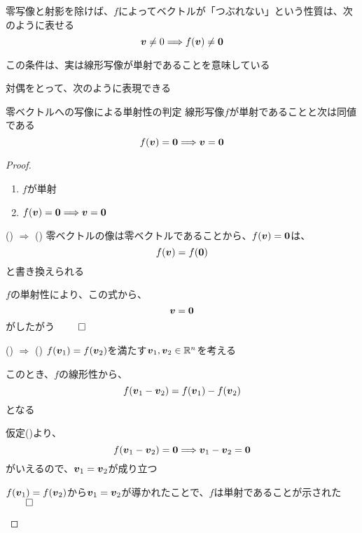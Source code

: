 \documentclass[../../../topic_linear-algebra]{subfiles}
\begin{document}
\sectionline

零写像と射影を除けば、$f$によってベクトルが「つぶれない」という性質は、次のように表せる
\begin{equation*}
  \vb*{v} \neq 0 \Longrightarrow f(\vb*{v}) \neq \vb*{0}
\end{equation*}


この条件は、実は線形写像が単射であることを意味している

対偶をとって、次のように表現できる

\begin{theorem}{零ベクトルへの写像による単射性の判定}\label{thm:injective-zero-test}
  線形写像$f$が単射であることと次は同値である
  \begin{equation*}
    f(\vb*{v}) = \vb*{0} \Longrightarrow \vb*{v} = \vb*{0}
  \end{equation*}
\end{theorem}

\begin{proof}
  \begin{enumerate}[label=\romanlabel]
    \item $f$が単射
    \item $f(\vb*{v}) = \vb*{0} \Longrightarrow \vb*{v} = \vb*{0}$
  \end{enumerate}

  \begin{subpattern}{() $\Longrightarrow$ ()}
    零ベクトルの像は零ベクトルであることから、$f(\vb*{v}) = \vb*{0}$は、
    \begin{equation*}
      f(\vb*{v}) = f(\vb*{0})
    \end{equation*}
    と書き換えられる

    $f$の単射性により、この式から、
    \begin{equation*}
      \vb*{v} = \vb*{0}
    \end{equation*}
    がしたがう $\qed$
  \end{subpattern}

  \begin{subpattern}{() $\Longrightarrow$ ()}
    $f(\vb*{v}_1) = f(\vb*{v}_2)$を満たす$\vb*{v}_1, \vb*{v}_2 \in \mathbb{R}^n$を考える

    このとき、$f$の線形性から、
    \begin{equation*}
      f(\vb*{v}_1 - \vb*{v}_2) = f(\vb*{v}_1) - f(\vb*{v}_2)
    \end{equation*}
    となる

    仮定()より、
    \begin{equation*}
      f(\vb*{v}_1 - \vb*{v}_2) = \vb*{0} \Longrightarrow \vb*{v}_1 - \vb*{v}_2 = \vb*{0}
    \end{equation*}
    がいえるので、$\vb*{v}_1 = \vb*{v}_2$が成り立つ

    $f(\vb*{v}_1) = f(\vb*{v}_2)$から$\vb*{v}_1 = \vb*{v}_2$が導かれたことで、$f$は単射であることが示された $\qed$
  \end{subpattern}
\end{proof}
\end{document}

